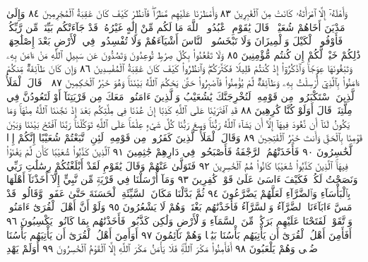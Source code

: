 وَأَهْلَهُۥٓ إِلَّا ٱمْرَأَتَهُۥ كَانَتْ مِنَ ٱلْغَٰبِرِينَ ٨٣ وَأَمْطَرْنَا
عَلَيْهِم مَّطَرࣰاۖ فَٱنظُرْ كَيْفَ كَانَ عَٰقِبَةُ ٱلْمُجْرِمِينَ ٨٤
وَإِلَىٰ مَدْيَنَ أَخَاهُمْ شُعَيْبࣰاۚ قَالَ يَٰقَوْمِ ٱعْبُدُوا۟ ٱللَّهَ
مَا لَكُم مِّنْ إِلَٰهٍ غَيْرُهُۥۖ قَدْ جَآءَتْكُم بَيِّنَةࣱ مِّن رَّبِّكُمْۖ
فَأَوْفُوا۟ ٱلْكَيْلَ وَٱلْمِيزَانَ وَلَا تَبْخَسُوا۟ ٱلنَّاسَ
أَشْيَآءَهُمْ وَلَا تُفْسِدُوا۟ فِي ٱلْأَرْضِ بَعْدَ إِصْلَٰحِهَاۚ
ذَٰلِكُمْ خَيْرࣱ لَّكُمْ إِن كُنتُم مُّؤْمِنِينَ ٨٥ وَلَا
تَقْعُدُوا۟ بِكُلِّ صِرَٰطࣲ تُوعِدُونَ وَتَصُدُّونَ عَن
سَبِيلِ ٱللَّهِ مَنْ ءَامَنَ بِهِۦ وَتَبْغُونَهَا عِوَجࣰاۚ وَٱذْكُرُوٓا۟
إِذْ كُنتُمْ قَلِيلࣰا فَكَثَّرَكُمْۖ وَٱنظُرُوا۟ كَيْفَ كَانَ
عَٰقِبَةُ ٱلْمُفْسِدِينَ ٨٦ وَإِن كَانَ طَآئِفَةࣱ مِّنكُمْ
ءَامَنُوا۟ بِٱلَّذِيٓ أُرْسِلْتُ بِهِۦ وَطَآئِفَةࣱ لَّمْ يُؤْمِنُوا۟ فَٱصْبِرُوا۟
حَتَّىٰ يَحْكُمَ ٱللَّهُ بَيْنَنَاۚ وَهُوَ خَيْرُ ٱلْحَٰكِمِينَ ٨٧
۞ قَالَ ٱلْمَلَأُ ٱلَّذِينَ ٱسْتَكْبَرُوا۟ مِن قَوْمِهِۦ لَنُخْرِجَنَّكَ يَٰشُعَيْبُ
وَٱلَّذِينَ ءَامَنُوا۟ مَعَكَ مِن قَرْيَتِنَآ أَوْ لَتَعُودُنَّ فِي مِلَّتِنَاۚ قَالَ أَوَلَوْ
كُنَّا كَٰرِهِينَ ٨٨ قَدِ ٱفْتَرَيْنَا عَلَى ٱللَّهِ كَذِبًا إِنْ عُدْنَا فِي مِلَّتِكُم بَعْدَ
إِذْ نَجَّىٰنَا ٱللَّهُ مِنْهَاۚ وَمَا يَكُونُ لَنَآ أَن نَّعُودَ فِيهَآ إِلَّآ أَن يَشَآءَ
ٱللَّهُ رَبُّنَاۚ وَسِعَ رَبُّنَا كُلَّ شَيْءٍ عِلْمًاۚ عَلَى ٱللَّهِ تَوَكَّلْنَاۚ رَبَّنَا ٱفْتَحْ
بَيْنَنَا وَبَيْنَ قَوْمِنَا بِٱلْحَقِّ وَأَنتَ خَيْرُ ٱلْفَٰتِحِينَ ٨٩ وَقَالَ ٱلْمَلَأُ ٱلَّذِينَ
كَفَرُوا۟ مِن قَوْمِهِۦ لَئِنِ ٱتَّبَعْتُمْ شُعَيْبًا إِنَّكُمْ إِذࣰا لَّخَٰسِرُونَ ٩٠
فَأَخَذَتْهُمُ ٱلرَّجْفَةُ فَأَصْبَحُوا۟ فِي دَارِهِمْ جَٰثِمِينَ ٩١ ٱلَّذِينَ
كَذَّبُوا۟ شُعَيْبࣰا كَأَن لَّمْ يَغْنَوْا۟ فِيهَاۚ ٱلَّذِينَ كَذَّبُوا۟ شُعَيْبࣰا كَانُوا۟
هُمُ ٱلْخَٰسِرِينَ ٩٢ فَتَوَلَّىٰ عَنْهُمْ وَقَالَ يَٰقَوْمِ لَقَدْ أَبْلَغْتُكُمْ
رِسَٰلَٰتِ رَبِّي وَنَصَحْتُ لَكُمْۖ فَكَيْفَ ءَاسَىٰ عَلَىٰ قَوْمࣲ
كَٰفِرِينَ ٩٣ وَمَآ أَرْسَلْنَا فِي قَرْيَةࣲ مِّن نَّبِيٍّ إِلَّآ أَخَذْنَآ أَهْلَهَا
بِٱلْبَأْسَآءِ وَٱلضَّرَّآءِ لَعَلَّهُمْ يَضَّرَّعُونَ ٩٤ ثُمَّ بَدَّلْنَا
مَكَانَ ٱلسَّيِّئَةِ ٱلْحَسَنَةَ حَتَّىٰ عَفَوا۟ وَّقَالُوا۟ قَدْ مَسَّ ءَابَآءَنَا
ٱلضَّرَّآءُ وَٱلسَّرَّآءُ فَأَخَذْنَٰهُم بَغْتَةࣰ وَهُمْ لَا يَشْعُرُونَ ٩٥
وَلَوْ أَنَّ أَهْلَ ٱلْقُرَىٰٓ ءَامَنُوا۟ وَٱتَّقَوْا۟ لَفَتَحْنَا عَلَيْهِم بَرَكَٰتࣲ
مِّنَ ٱلسَّمَآءِ وَٱلْأَرْضِ وَلَٰكِن كَذَّبُوا۟ فَأَخَذْنَٰهُم بِمَا كَانُوا۟
يَكْسِبُونَ ٩٦ أَفَأَمِنَ أَهْلُ ٱلْقُرَىٰٓ أَن يَأْتِيَهُم بَأْسُنَا
بَيَٰتࣰا وَهُمْ نَآئِمُونَ ٩٧ أَوَأَمِنَ أَهْلُ ٱلْقُرَىٰٓ أَن يَأْتِيَهُم
بَأْسُنَا ضُحࣰى وَهُمْ يَلْعَبُونَ ٩٨ أَفَأَمِنُوا۟ مَكْرَ ٱللَّهِۚ
فَلَا يَأْمَنُ مَكْرَ ٱللَّهِ إِلَّا ٱلْقَوْمُ ٱلْخَٰسِرُونَ ٩٩ أَوَلَمْ يَهْدِ
